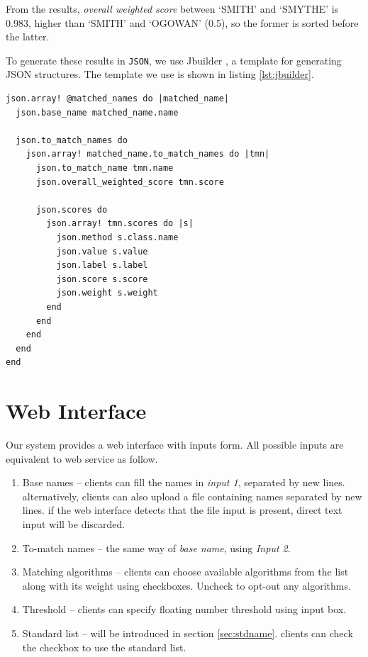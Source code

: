 From the results, \emph{overall weighted score} between `SMITH' and `SMYTHE'
is 0.983, higher than `SMITH' and `O\textquotesingle GOWAN' (0.5), so the former is sorted
before the latter.

To generate these results in \texttt{JSON}, we use Jbuilder \cite[]{jbuiler},
a template for generating JSON structures. The template we use is shown
in listing \ref{lst:jbuilder}.

\begin{minipage}{\linewidth}
\begin{lstlisting}[label={lst:jbuilder}, caption={Jbuilder template for generating \texttt{JSON} results.}]
json.array! @matched_names do |matched_name|
  json.base_name matched_name.name

  json.to_match_names do
    json.array! matched_name.to_match_names do |tmn|
      json.to_match_name tmn.name
      json.overall_weighted_score tmn.score

      json.scores do
        json.array! tmn.scores do |s|
          json.method s.class.name
          json.value s.value
          json.label s.label
          json.score s.score
          json.weight s.weight
        end
      end
    end
  end
end
\end{lstlisting}
\end{minipage}


\section{Web Interface}
\label{sec:wi}

Our system provides a web interface with inputs form.
All possible inputs are equivalent to web service as follow.

\begin{enumerate}
  \item Base names -- clients can fill the names in \emph{input 1}, separated
    by new lines. alternatively, clients can also upload a file containing names
    separated by new lines. if the web interface detects that the file input
    is present, direct text input will be discarded.
  \item To-match names -- the same way of \emph{base name}, using \emph{Input 2}.
  \item Matching algorithms -- clients can choose available algorithms
    from the list along with its weight using checkboxes. Uncheck to
    opt-out any algorithms.
  \item Threshold -- clients can specify floating number threshold using input box.
  \item Standard list -- will be introduced in section \ref{sec:stdname}.
    clients can check the checkbox to use the standard list.
\end{enumerate}

